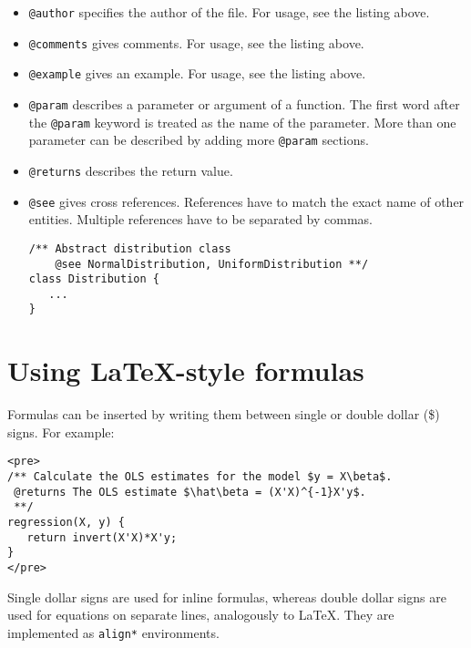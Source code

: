 \begin{itemize}
\item {\tt @author} specifies the author of the file. For  usage, see the listing above.

\item {\tt @comments} gives comments. For usage, see the listing above.

\item {\tt @example} gives an example. For usage, see the listing above.

\item {\tt @param} describes a parameter or argument of a function. The 
first word after the {\tt @param} keyword is treated as the name of the 
parameter. More than one parameter can be described by adding more {\tt @param} sections.

\item {\tt @returns} describes the return value.

\item {\tt @see} gives cross references. References have to 
match the exact name of other entities. Multiple references have to be
separated by commas.
\begin{lstlisting}
/** Abstract distribution class
    @see NormalDistribution, UniformDistribution **/
class Distribution { 
   ...
}
\end{lstlisting}

\end{itemize}





\section{Using \LaTeX-style formulas}
Formulas can be inserted by writing them between single or double dollar (\$) signs. 
For example:
\begin{lstlisting}
<pre>
/** Calculate the OLS estimates for the model $y = X\beta$.
 @returns The OLS estimate $\hat\beta = (X'X)^{-1}X'y$.
 **/
regression(X, y) {
   return invert(X'X)*X'y;
}
</pre>
\end{lstlisting}

Single dollar signs are used for inline formulas, whereas double dollar signs
are used for equations on separate lines, analogously to \LaTeX.  They 
are implemented as {\tt align*} environments.

